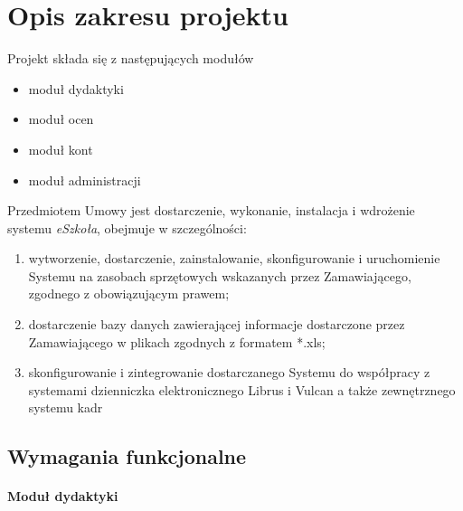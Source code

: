 \documentclass{article}
\begin{document}
\newpage
\section{Opis zakresu projektu}


Projekt składa się z następujących modułów
\begin{itemize}
    \item moduł dydaktyki
    \item moduł ocen
    \item moduł kont
    \item moduł administracji
\end{itemize}

Przedmiotem Umowy jest dostarczenie, wykonanie, instalacja i wdrożenie systemu \textit{eSzkoła}, obejmuje w szczególności:
\begin{enumerate}
    \item wytworzenie, dostarczenie, zainstalowanie, skonfigurowanie i uruchomienie Systemu na zasobach sprzętowych wskazanych przez Zamawiającego, zgodnego z obowiązującym prawem;
    \item dostarczenie bazy danych zawierającej informacje dostarczone przez Zamawiającego w plikach zgodnych z formatem *.xls;
    \item skonfigurowanie i zintegrowanie dostarczanego Systemu do współpracy z systemami dzienniczka elektronicznego Librus i Vulcan a także zewnętrznego systemu kadr
\end{enumerate}

\subsection{Wymagania funkcjonalne}

\paragraph{Moduł dydaktyki} \mbox{}\\
\end{document}

